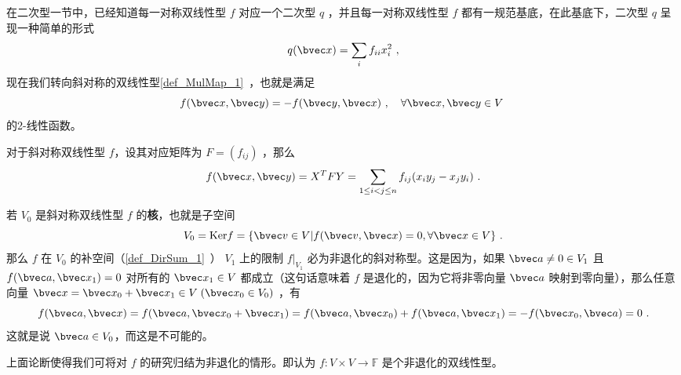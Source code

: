 
在二次型一节中，已经知道每一对称双线性型 $f$ 对应一个二次型 $q$ ，并且每一对称双线性型 $f$ 都有一规范基底，在此基底下，二次型 $q$ 呈现一种简单的形式
\begin{equation}
q(\bvec x)=\sum_{i}f_{ii}x_i^2~,
\end{equation}
现在我们转向斜对称的双线性型\autoref{def_MulMap_1}~，也就是满足 
\begin{equation}
f(\bvec x,\bvec y)=-f(\bvec y,\bvec x)~,\quad \forall \bvec x,\bvec y\in V~
\end{equation}
的2-线性函数。

对于斜对称双线性型 $f$，设其对应矩阵为 $F=(f_{ij})$ ，那么
\begin{equation}
f(\bvec x,\bvec y)=X^{T}FY=\sum_{1\leq i<j\leq n}f_{ij}(x_iy_j-x_jy_i)~.
\end{equation}

若 $V_0$ 是斜对称双线性型 $f$ 的\textbf{核}，也就是子空间
\begin{equation}
V_0=\mathrm{Ker} f=\{\bvec v\in V|f(\bvec v,\bvec x)=0,\forall\bvec x\in V\}~.
\end{equation}
那么 $f$ 在 $V_0$ 的补空间（\autoref{def_DirSum_1}~） $V_1$ 上的限制 $f|_{V_1}$ 必为非退化的斜对称型。这是因为，如果 $\bvec a\neq0\in V_1$ 且 $f(\bvec a,\bvec x_1)=0$ 对所有的 $\bvec x_1\in V$ 都成立（这句话意味着 $f$ 是退化的，因为它将非零向量 $\bvec a$ 映射到零向量），那么任意向量 $\bvec x=\bvec x_0+\bvec x_1\in V \;(\bvec x_0\in V_0)$ ，有
\begin{equation}
f(\bvec a,\bvec x)=f(\bvec a,\bvec x_0+\bvec x_1)=f(\bvec a,\bvec x_0)+f(\bvec a,\bvec x_1)=-f(\bvec x_0,\bvec a)=0~.
\end{equation}
 这就是说 $\bvec a\in V_0$，而这是不可能的。

 上面论断使得我们可将对 $f$ 的研究归结为非退化的情形。即认为 $f:V\times V\rightarrow\mathbb{F}$ 是个非退化的双线性型。

